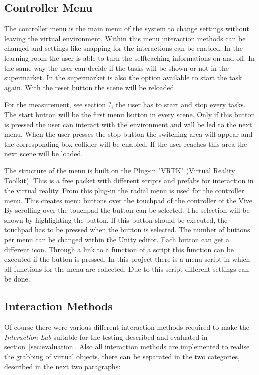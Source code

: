 \subsection{Controller Menu} \label{sec:Menu}
The controller menu is the main menu of the system to change settings without leaving the virtual environment. Within this menu interaction methods can be changed and settings like snapping for the interactions can be enabled. In the learning room	the user is able to turn the selfteaching informations on and off. In the same way the user can decide if the tasks will be shown or not in the supermarket. In the supermarket is also the option available to start the task again. With the reset button the scene will be reloaded.

For the measurement, see section ?, the user has to start and stop every tasks. The start button will be the first menu button in every scene. Only if this button is pressed the user can interact with the environment and will be led to the next menu. When the user presses the stop button the switching area will appear and the corresponding box collider will be enabled. If the user reaches this area the next scene will be loaded.

The structure of the menu is built on the Plug-in "VRTK" (Virtual Reality Toolkit). %
This is a free packet with different scripts and prefabs for interaction in the virtual reality. From this plug-in the radial menu is used for the controller menu. This creates menu buttons over the touchpad of the controller of the Vive. By scrolling over the touchpad the button can be selected. The selection will be shown by highlighting the button. If this button should be executed, the touchpad has to be pressed when the button is selected. The number of buttons per menu can be changed within the Unity editor. Each button can get a different icon. Through a link to a function of a script this function can be executed if the button is pressed. In this project there is a menu script in which all functions for the menu are collected. Due to this script different settings can be done. %


\subsection{Interaction Methods}\label{sec:Interactions}
Of course there were various different interaction methods required to make the \textit{Interaction Lab} suitable for the testing described and evaluated in section~\ref{sec:evaluation}. Also all interaction methods are implemented to realise the grabbing of virtual objects, there can be separated in the two categories, described in the next two paragraphs:

